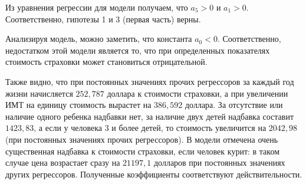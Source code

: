 \documentclass[a4paper,12pt]{article}
\begin{document}
Из уравнения регрессии для модели получаем, что $a_5 > 0$ и $a_1 > 0$. Соответственно, гипотезы 1 и 3 (первая часть) верны.

Анализируя модель, можно заметить, что константа $a_0 < 0$. Соответственно, недостатком этой модели является то, что при определенных показателях стоимость страховки может становиться отрицательной.

Также видно, что при постоянных значениях прочих регрессоров за каждый год жизни начисляется $252,787$ доллара к стоимости страховки, а при увеличении ИМТ на единицу стоимость вырастет на $386,592$ доллара. За отсутствие или наличие одного ребенка надбавки нет, за наличие двух детей надбавка составит $1423,83$, а если у человека 3 и более детей, то стоимость увеличится на $2042,98$ (при постоянных значениях прочих регрессоров). В модели отмечена очень существенная надбавка к стоимости страховки, если человек курит: в таком случае цена возрастает сразу на $21197,1$ долларов при постоянных значениях других регрессоров. Полученные коэффициенты соответствуют действительности.
\end{document}
